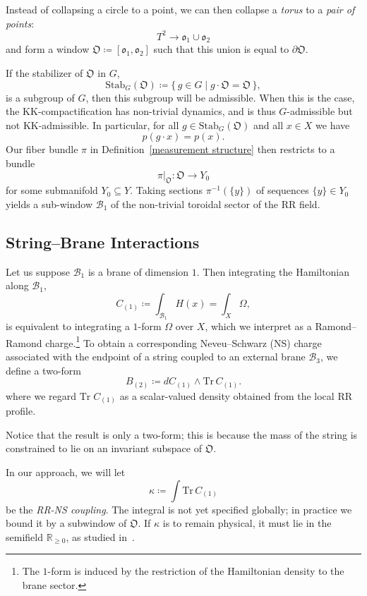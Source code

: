 \documentclass{article}
\numberwithin{tm}{section}
\numberwithin{dn}{section}
\numberwithin{as}{section}
\numberwithin{rk}{section}
\numberwithin{lem}{section}
\numberwithin{ax}{section}
\numberwithin{pp}{section}
\numberwithin{eg}{section}
\numberwithin{war}{section}
\numberwithin{equation}{section}
\numberwithin{prop}{section}
\numberwithin{nt}{section}
\numberwithin{rc}{section}
\numberwithin{setup}{section}
\begin{document}
\medskip

 Instead of collapsing a circle to a point, we can then collapse a \emph{torus} to a \emph{pair of points}:
\[
T^2 \longrightarrow \mathfrak{o}_1 \cup \mathfrak{o}_2
\]
and form a window $\mathfrak{O} \coloneq [\mathfrak{o}_1, \mathfrak{o}_2]$ such that this union is equal to $\partial \mathfrak{O}$.

If the stabilizer of $\mathfrak{O}$ in $G$,
\[
\mathrm{Stab}_G(\mathfrak{O}) \coloneq \{\, g \in G \mid g \cdot \mathfrak{O} = \mathfrak{O} \,\},
\]
is a subgroup of $G$, then this subgroup will be admissible. When this is the case, the KK-compactification has non-trivial dynamics, and is thus $G$-admissible but not KK-admissible. In particular, for all $g \in \mathrm{Stab}_G(\mathfrak{O})$ and all $x \in X$ we have
\[
p(g \cdot x) = p(x) .
\]
Our fiber bundle $\pi$ in Definition~\ref{measurement structure} then restricts to a bundle
\[
\pi|_{\mathfrak{O}} : \mathfrak{O} \longrightarrow Y_0
\]
for some submanifold $Y_0 \subseteq Y$. Taking sections $\pi^{-1}(\{y\})$ of sequences $\{y\} \in Y_0$ yields a sub-window $\mathcal{B}_1$ of the non-trivial toroidal sector of the RR field.

\subsection{String--Brane Interactions}\label{SB}
Let us suppose $\mathcal{B}_1$ is a brane of dimension $1$. Then integrating the Hamiltonian along $\mathcal{B}_1$,
\begin{equation}
	C_{(1)} \coloneq \int_{\mathcal{B}_1} H(x) = \int_X \Omega,
\end{equation}
is equivalent to integrating a $1$-form $\Omega$ over $X$, which we interpret as a Ramond--Ramond charge.\footnote{The $1$-form is induced by the restriction of the Hamiltonian density to the brane sector.} To obtain a corresponding Neveu--Schwarz (NS) charge associated with the endpoint of a string coupled to an external brane $\mathcal{B}_3$, we define a two-form
\begin{equation}
	B_{(2)} \coloneq d C_{(1)} \wedge \mathrm{Tr}\, C_{(1)} .
\end{equation}
where we regard $\mathrm{Tr} \; C_{(1)}$ as a scalar-valued density obtained from the local RR profile.

Notice that the result is only a two-form; this is because the mass of the string is constrained to lie on an invariant subspace of $\mathfrak{O}$.

In our approach, we will let
\[
\kappa \coloneq \int \mathrm{Tr}\, C_{(1)}
\]
be the \emph{RR-NS coupling}. The integral is not yet specified globally; in practice we bound it by a subwindow of $\mathfrak{O}$. If $\kappa$ is to remain physical, it must lie in the semifield $\mathbb{R}_{\geq 0}$, as studied in~\cite{Haderi}.
\end{document}

